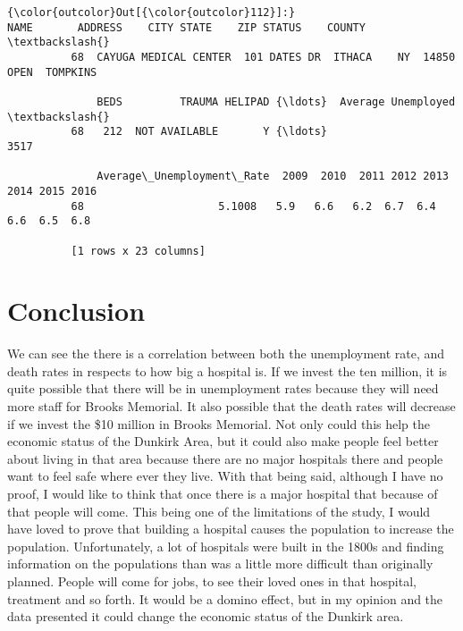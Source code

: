 \documentclass[11pt]{article}
\begin{document}
\begin{Verbatim}[commandchars=\\\{\}]
{\color{outcolor}Out[{\color{outcolor}112}]:}                      NAME       ADDRESS    CITY STATE    ZIP STATUS    COUNTY  \textbackslash{}
          68  CAYUGA MEDICAL CENTER  101 DATES DR  ITHACA    NY  14850   OPEN  TOMPKINS   
          
              BEDS         TRAUMA HELIPAD {\ldots}  Average Unemployed   \textbackslash{}
          68   212  NOT AVAILABLE       Y {\ldots}                 3517   
          
              Average\_Unemployment\_Rate  2009  2010  2011 2012 2013 2014 2015 2016  
          68                     5.1008   5.9   6.6   6.2  6.7  6.4  6.6  6.5  6.8  
          
          [1 rows x 23 columns]
\end{Verbatim}
            
    \section{Conclusion}\label{conclusion}

We can see the there is a correlation between both the unemployment
rate, and death rates in respects to how big a hospital is. If we invest
the ten million, it is quite possible that there will be in unemployment
rates because they will need more staff for Brooks Memorial. It also
possible that the death rates will decrease if we invest the \$10
million in Brooks Memorial. Not only could this help the economic status
of the Dunkirk Area, but it could also make people feel better about
living in that area because there are no major hospitals there and
people want to feel safe where ever they live. With that being said,
although I have no proof, I would like to think that once there is a
major hospital that because of that people will come. This being one of
the limitations of the study, I would have loved to prove that building
a hospital causes the population to increase the population.
Unfortunately, a lot of hospitals were built in the 1800s and finding
information on the populations than was a little more difficult than
originally planned. People will come for jobs, to see their loved ones
in that hospital, treatment and so forth. It would be a domino effect,
but in my opinion and the data presented it could change the economic
status of the Dunkirk area.


    
    
    
    
\end{document}
